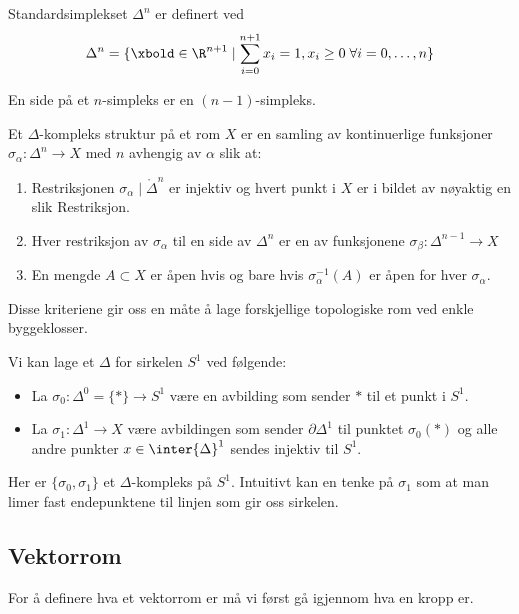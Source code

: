 \begin{definition}\label{Def:StndrdSimpKomp}
    Standardsimplekset $\Delta^n$ er definert ved
    \[\Delta^n = \{ \xbold\in\R^{n + 1} \mid \sum_{i = 0}^{n + 1}x_i=1, x_i\geq 0\;\forall i=0,\dots,n\}\]
\end{definition}

En side på et $n$-simpleks er en $(n-1)$-simpleks.
\begin{definition}\label{Def:Deltastrkt}
    Et $\Delta$-kompleks struktur på et rom $X$ er en samling av kontinuerlige funksjoner $\sigma_\alpha: \Delta^n\to X$ med $n$ avhengig av $\alpha$ slik at:
    \begin{enumerate}
        \item Restriksjonen $\sigma_\alpha\mid\mathring{\Delta}^n$ er injektiv og hvert punkt i $X$ er i bildet av nøyaktig en slik Restriksjon.
        \item Hver restriksjon av $\sigma_\alpha$ til en side av $\Delta^n$ er en av funksjonene $\sigma_\beta: \Delta^{n-1}\to X$
        \item En mengde $A\subset X$ er åpen hvis og bare hvis $\sigma_\alpha^{-1}(A)$ er åpen for hver $\sigma_\alpha$.
    \end{enumerate}
\end{definition}
Disse kriteriene gir oss en måte å lage forskjellige topologiske rom ved enkle byggeklosser.

\begin{example}[ex:SirkelDkomp]
    Vi kan lage et $\Delta$ for sirkelen $S^1$ ved følgende:
    \begin{itemize}
        \item La $\sigma_0:\Delta^0=\{\ast\}\to S^1$ være en avbilding som sender $\ast$ til et punkt i $S^1$.
        \item La $\sigma_1: \Delta^1\to X$ være avbildingen som sender $\partial \Delta^1$ til punktet $\sigma_0(\ast)$ og alle andre punkter $x\in\inter{\Delta}^1$ sendes injektiv til $S^1$.
    \end{itemize}
    Her er $\{\sigma_0,\sigma_1\}$ et $\Delta$-kompleks på $S^1$. Intuitivt kan en tenke på $\sigma_1$ som at man limer fast endepunktene til linjen som gir oss sirkelen.
\end{example}

\subsection{Vektorrom}\label{Sec:Vekt}
For å definere hva et vektorrom er må vi først gå igjennom hva en kropp er.

